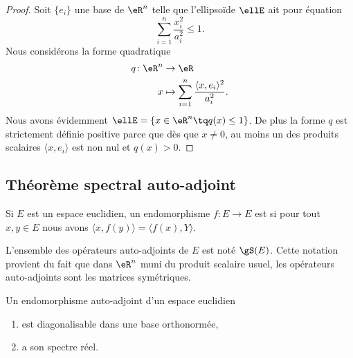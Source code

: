 \begin{proof}
    Soit \( \{ e_i \}\) une base de \( \eR^n\) telle que l'ellipsoïde \( \ellE\) ait pour équation
    \begin{equation}
        \sum_{i=1}^n\frac{ x_i^2 }{ a_i^2 }\leq 1.
    \end{equation}
    Nous considérons la forme quadratique
    \begin{equation}
        \begin{aligned}
            q\colon \eR^n&\to \eR \\
            x&\mapsto \sum_{i=1}^n\frac{ \langle x, e_i\rangle^2 }{ a_i^2 }. 
        \end{aligned}
    \end{equation}
    Nous avons évidemment \( \ellE=\{ x\in \eR^n\tq q(x)\leq 1 \}\). De plus la forme \( q\) est strictement définie positive parce que dès que \( x\neq 0\), au moins un des produits scalaires \( \langle x, e_i\rangle \) est non nul et \( q(x)> 0\).
\end{proof}

\subsection{Théorème spectral auto-adjoint}

\begin{definition}
    Si \( E\) est un espace euclidien, un endomorphisme \( f\colon E\to E\) est  si pour tout \( x,y\in E\) nous avons \( \langle x, f(y)\rangle=\langle f(x), Y\rangle  \). 
\end{definition}
L'ensemble des opérateurs auto-adjoints de \( E\) est noté \( \gS(E)\). Cette notation provient du fait que dans \( \eR^n\) muni du produit scalaire usuel, les opérateurs auto-adjoints sont les matrices symétriques.

\begin{theorem} \label{ThoRSBahHH}
    Un endomorphisme auto-adjoint d'un espace euclidien
    \begin{enumerate}
        \item
            est diagonalisable dans une base orthonormée,
        \item
            a son spectre réel.
    \end{enumerate}
\end{theorem}

